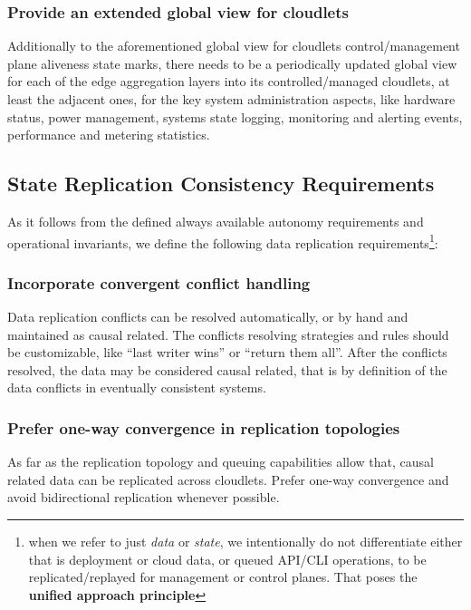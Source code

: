 \documentclass[conference]{IEEEtran}
\begin{document}
\subsubsection{Provide an extended global view for cloudlets}

Additionally to the aforementioned global view for cloudlets control/management
plane aliveness state marks, there needs to be a periodically updated global
view for each of the edge aggregation layers into its controlled/managed
cloudlets, at least the adjacent ones, for the key system administration
aspects, like hardware status, power management, systems state logging,
monitoring and alerting events, performance and metering statistics.

\subsection{State Replication Consistency Requirements}

As it follows from the defined always available autonomy requirements and
operational invariants, we define the following data replication
requirements\footnote{when we refer to just \textit{data} or \textit{state}, we
intentionally do not differentiate either that is deployment or cloud data, or
queued API/CLI operations, to be replicated/replayed for management or control
planes. That poses the \textbf{unified approach principle}}:

\subsubsection{Incorporate convergent conflict handling\cite{b1}}

Data replication conflicts can be resolved automatically, or by hand and
maintained as causal related. The conflicts resolving strategies and rules
should be customizable, like ``last writer wins'' or ``return them all''. After
the conflicts resolved, the data may be considered causal related, that is by
definition\cite{b1} of the data conflicts in eventually consistent systems.

\subsubsection{Prefer one-way convergence in replication topologies}

As far as the replication topology and queuing capabilities allow
that, causal related data can be replicated across cloudlets. Prefer one-way
convergence and avoid bidirectional replication whenever possible.
\end{document}
